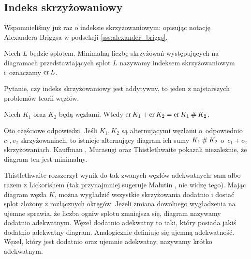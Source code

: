 
\subsection{Indeks skrzyżowaniowy}
Wspomnieliśmy już raz o indeksie skrzyżowaniowym: opisując notację Alexandera-Briggsa w podsekcji \ref{sss:alexander_briggs}.

%
\begin{definition}
    Niech $L$ będzie splotem.
    Minimalną liczbę skrzyżowań występujących na diagramach przedstawiających splot $L$ nazywamy indeksem skrzyżowaniowym i~oznaczamy $\operatorname{cr} L$.
\end{definition}

Pytanie, czy indeks skrzyżowaniowy jest addytywny, to jeden z najstarszych problemów teorii węzłów.

\begin{conjecture}
%
%
\label{con:crossing_additive}%
    Niech $K_1$ oraz $K_2$ będą węzłami.
    Wtedy $\operatorname{cr} K_1 + \operatorname{cr} K_2 = \operatorname{cr} K_1 \mathbin{\#} K_2$.
\end{conjecture}

Oto częściowe odpowiedzi.
Jeśli $K_1, K_2$ są alternującymi węzłami o~odpowiednio $c_1, c_2$ skrzyżowaniach, to istnieje alternujący diagram ich sumy $K_1 \mathbin{\#} K_2$ o~$c_1 + c_2$ skrzyżowaniach.
%
Kauffman \cite[twierdzenie 2.10]{kauffman1987}, Murasugi \cite[wniosek 6]{murasugi1987} oraz Thistlethwaite \cite[wniosek 1]{thistlethwaite1987} pokazali niezależnie, że diagram ten jest minimalny.
%
%
%

Thistlethwaite rozszerzył wynik do tak zwanych węzłów adekwatnych: sam \cite{thistlethwaite1988} albo razem z Lickorishem \cite{lickorish1988} (tak przynajmniej sugeruje Malutin \cite[s. 3]{malyutin2016}, nie widzę tego).
%
%
%
Mając diagram węzła $K$, można wygładzić wszystkie skrzyżowania dodatnio i dostać splot złożony z rozłącznych okręgów.
Jeżeli zmiana dowolnego wygładzenia na ujemne sprawia, że liczba ogniw splotu zmniejsza się, diagram nazywamy dodatnio adekwatnym.
Węzeł dodatnio adekwatny to taki, który posiada jakiś dodatnio adekwatny diagram.
Analogicznie definiuje się ujemną adekwatność.
Węzeł, który jest dodatnio oraz ujemnie adekwatny, nazywamy krótko adekwatnym.

